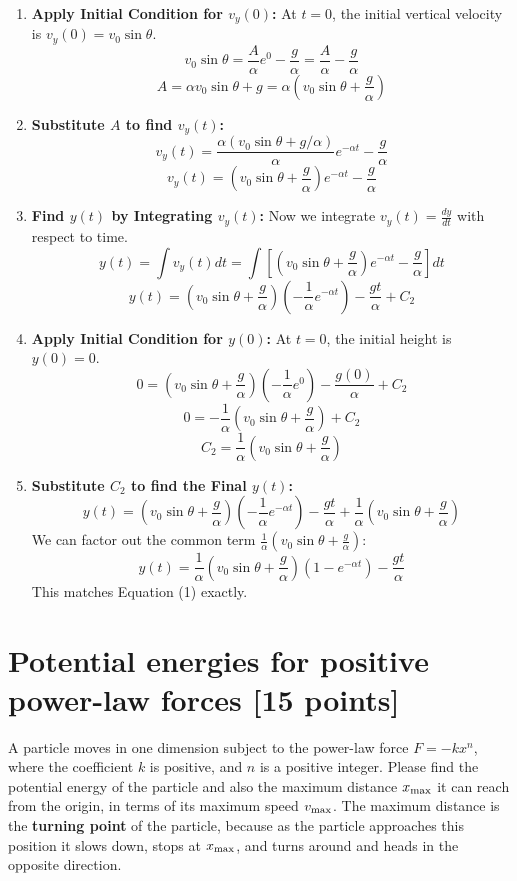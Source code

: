 \documentclass[11pt, a4paper]{article} %
\begin{document}
\begin{enumerate}
    \item \textbf{Apply Initial Condition for $v_y(0)$:} At $t=0$, the initial vertical velocity is $v_y(0) = v_0 \sin \theta$.
    $$v_0 \sin \theta = \frac{A}{\alpha} e^0 - \frac{g}{\alpha} = \frac{A}{\alpha} - \frac{g}{\alpha}$$
    $$A = \alpha v_0 \sin \theta + g = \alpha \left( v_0 \sin \theta + \frac{g}{\alpha} \right)$$

    \item \textbf{Substitute $A$ to find $v_y(t)$:}
    $$v_y(t) = \frac{\alpha (v_0 \sin \theta + g/\alpha)}{\alpha} e^{-\alpha t} - \frac{g}{\alpha}$$
    $$v_y(t) = \left( v_0 \sin \theta + \frac{g}{\alpha} \right) e^{-\alpha t} - \frac{g}{\alpha}$$

    \item \textbf{Find $y(t)$ by Integrating $v_y(t)$:} Now we integrate $v_y(t) = \frac{dy}{dt}$ with respect to time.
    $$y(t) = \int v_y(t) dt = \int \left[ \left( v_0 \sin \theta + \frac{g}{\alpha} \right) e^{-\alpha t} - \frac{g}{\alpha} \right] dt$$
    $$y(t) = \left( v_0 \sin \theta + \frac{g}{\alpha} \right) \left( -\frac{1}{\alpha} e^{-\alpha t} \right) - \frac{g t}{\alpha} + C_2$$

    \item \textbf{Apply Initial Condition for $y(0)$:} At $t=0$, the initial height is $y(0) = 0$.
    $$0 = \left( v_0 \sin \theta + \frac{g}{\alpha} \right) \left( -\frac{1}{\alpha} e^0 \right) - \frac{g(0)}{\alpha} + C_2$$
    $$0 = -\frac{1}{\alpha} \left( v_0 \sin \theta + \frac{g}{\alpha} \right) + C_2$$
    $$C_2 = \frac{1}{\alpha} \left( v_0 \sin \theta + \frac{g}{\alpha} \right)$$

    \item \textbf{Substitute $C_2$ to find the Final $y(t)$:}
    $$y(t) = \left( v_0 \sin \theta + \frac{g}{\alpha} \right) \left( -\frac{1}{\alpha} e^{-\alpha t} \right) - \frac{g t}{\alpha} + \frac{1}{\alpha} \left( v_0 \sin \theta + \frac{g}{\alpha} \right)$$
    We can factor out the common term $\frac{1}{\alpha} \left( v_0 \sin \theta + \frac{g}{\alpha} \right)$:
    $$y(t) = \frac{1}{\alpha} \left( v_0 \sin \theta + \frac{g}{\alpha} \right) \left( 1 - e^{-\alpha t} \right) - \frac{g t}{\alpha}$$
    This matches Equation (1) exactly.
\end{enumerate}

\newpage 
\section*{Potential energies for positive power-law forces [15 points]} 
A particle moves in one dimension subject to the power-law force $F=-kx^n$, where the coefficient $k$ is positive, and $n$ is a positive integer. Please find the potential energy of the particle and also the maximum distance $x_{\rm max}$ it can reach from the origin, in terms of its maximum speed $v_{\rm max}$. The maximum distance is the \textbf{turning point} of the particle, because as the particle approaches this position it slows down, stops at $x_{\rm max}$, and turns around and heads in the opposite direction.
\end{document}
